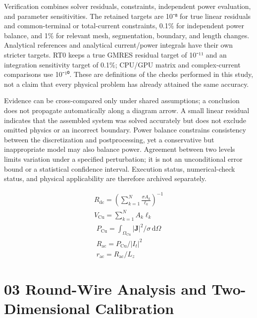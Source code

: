 \documentclass[journal,10pt]{IEEEtran}
\begin{document}
Verification combines solver residuals, constraints, independent power evaluation, and parameter sensitivities. The retained targets are 10⁻⁸ for true linear residuals and common-terminal or total-current constraints, 0.1\% for independent power balance, and 1\% for relevant mesh, segmentation, boundary, and length changes. Analytical references and analytical current/power integrals have their own stricter targets. RT0 keeps a true GMRES residual target of 10⁻¹¹ and an integration sensitivity target of 0.1\%; CPU/GPU matrix and complex-current comparisons use 10⁻¹⁰. These are definitions of the checks performed in this study, not a claim that every physical problem has already attained the same accuracy.


Evidence can be cross-compared only under shared assumptions; a conclusion does not propagate automatically along a diagram arrow. A small linear residual indicates that the assembled system was solved accurately but does not exclude omitted physics or an incorrect boundary. Power balance constrains consistency between the discretization and postprocessing, yet a conservative but inappropriate model may also balance power. Agreement between two levels limits variation under a specified perturbation; it is not an unconditional error bound or a statistical confidence interval. Execution status, numerical-check status, and physical applicability are therefore archived separately.


\hypertarget{E01}{}
\begin{equation}
\begin{gathered}
R_{\mathrm{dc}}=\left(\sum_{k=1}^{N}\frac{\sigma A_k}{\ell_k}\right)^{-1} \\
V_{\mathrm{Cu}}=\sum_{k=1}^{N}A_k\ell_k
\end{gathered}
\tag{1}\label{eq:E01}
\end{equation}
\hypertarget{E02}{}
\begin{equation}
\begin{gathered}
P_{\mathrm{Cu}}=\int_{\Omega_{\mathrm{Cu}}}|\mathbf J|^2/\sigma\,\mathrm d\Omega \\
R_{\mathrm{ac}}=P_{\mathrm{Cu}}/|I_t|^2 \\
r_{\mathrm{ac}}=R_{\mathrm{ac}}/L_z
\end{gathered}
\tag{2}\label{eq:E02}
\end{equation}
\FloatBarrier
\section*{03 Round-Wire Analysis and Two-Dimensional Calibration}
\hypertarget{chapter-03}{}
\end{document}
